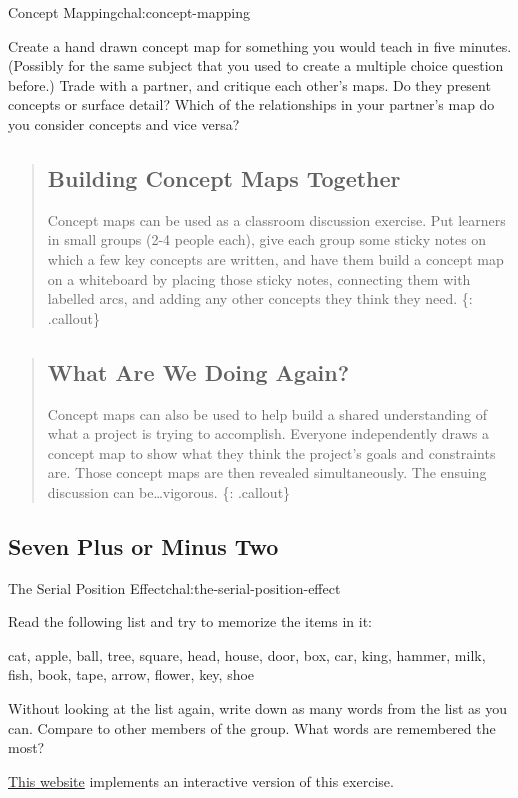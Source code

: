 \begin{challenge}{Concept Mapping}{chal:concept-mapping}

Create a hand drawn concept map for something you would teach in five
minutes. (Possibly for the same subject that you used to create a
multiple choice question before.) Trade with a partner, and critique
each other's maps. Do they present concepts or surface detail? Which of
the relationships in your partner's map do you consider concepts and
vice versa?
\end{challenge}

\begin{quote}
\subsection{Building Concept Maps
Together}\label{building-concept-maps-together}

Concept maps can be used as a classroom discussion exercise. Put
learners in small groups (2-4 people each), give each group some sticky
notes on which a few key concepts are written, and have them build a
concept map on a whiteboard by placing those sticky notes, connecting
them with labelled arcs, and adding any other concepts they think they
need. \{: .callout\}
\end{quote}

\begin{quote}
\subsection{What Are We Doing Again?}\label{what-are-we-doing-again}

Concept maps can also be used to help build a shared understanding of
what a project is trying to accomplish. Everyone independently draws a
concept map to show what they think the project's goals and constraints
are. Those concept maps are then revealed simultaneously. The ensuing
discussion can be\ldots{}vigorous. \{: .callout\}
\end{quote}

\subsection{Seven Plus or Minus Two}\label{seven-plus-or-minus-two}

\begin{challenge}{The Serial Position Effect}{chal:the-serial-position-effect}

Read the following list and try to memorize the items in it:

cat, apple, ball, tree, square, head, house, door, box, car, king,
hammer, milk, fish, book, tape, arrow, flower, key, shoe

Without looking at the list again, write down as many words from the
list as you can. Compare to other members of the group. What words are
remembered the most?

\href{http://cat.xula.edu/thinker/memory/working/serial}{This website}
implements an interactive version of this exercise.
\end{challenge}

